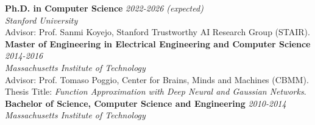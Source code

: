 \documentclass{article}
\newenvironment{changemargin}[2]{%
  \begin{list}{}{%
    \setlength{\topsep}{0pt}%
    \setlength{\leftmargin}{#1}%
    \setlength{\rightmargin}{#2}%
    \setlength{\listparindent}{\parindent}%
    \setlength{\itemindent}{\parindent}%
    \setlength{\parsep}{\parskip}%
  }%
  \item[]}{\end{list}
}
\newenvironment{body} {
		\vspace*{-16pt}
		\begin{changemargin}{-0.25in}{-0.5in}
	  }
		{\end{changemargin}\vspace{8pt plus 12pt}
	}
\begin{document}
\begin{body}
	\vspace{12pt}
	\textbf{Ph.D. in Computer Science} \hfill \emph{2022-2026 (expected)}\\
	\emph{Stanford University} \hfill {}\\
	Advisor: Prof. Sanmi Koyejo, Stanford Trustworthy AI Research Group (STAIR).\\

	\smallskip
	\textbf{Master of Engineering in Electrical Engineering and Computer Science} \hfill \emph{2014-2016}\\
	\emph{Massachusetts Institute of Technology} \hfill {}\\
	Advisor: Prof. Tomaso Poggio, Center for Brains, Minds and Machines (CBMM).\\
	Thesis Title: \emph{Function Approximation with Deep Neural and Gaussian Networks}.\\

	\smallskip
	\textbf{Bachelor of Science, Computer Science and Engineering} \hfill \emph{2010-2014}\\
	\emph{Massachusetts Institute of Technology} \hfill {}\\
\end{body}
\end{document}
